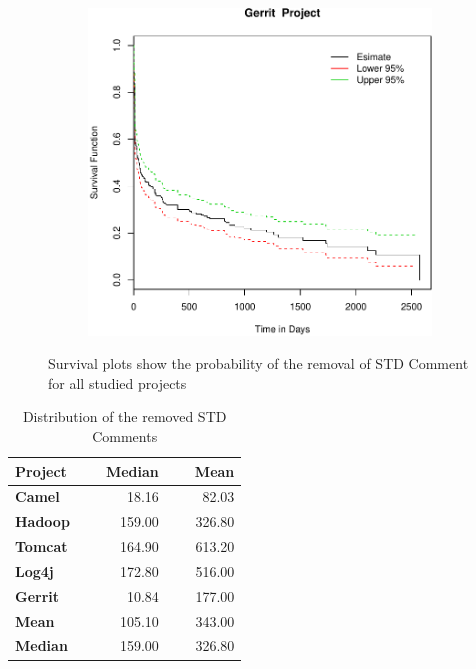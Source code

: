 \begin{figure}[t]
\begin{subfigure}[b]{0.195\textwidth}
		\label{fig:removal_comparison_log4j_survival}
	\end{subfigure}
	\begin{subfigure}[b]{0.195\textwidth}
		\includegraphics[width=\textwidth]{figures/Survival/gerrit.pdf}
		\label{fig:removal_comparison_tomcat_survival} 
	\end{subfigure}
	\caption{Survival plots show the probability of the removal of STD Comment for all studied projects}
\end{figure}
\begin{table}[t]
	\centering
	\caption{Distribution of the removed STD Comments}
	\label{tab:Distribution_of_the_removed_STD_Comments}
	\begin{tabular}{@{}l|rrrr@{}}
		\toprule
		\textbf{Project} &~&\textbf{Median} &~& \textbf{Mean} \\ \midrule
		\textbf{Camel} &~& 18.16 &~& 82.03 \\
		\textbf{Hadoop} &~& 159.00 &~& 326.80 \\
		\textbf{Tomcat} &~& 164.90 &~& 613.20 \\
		\textbf{Log4j} &~& 172.80 &~& 516.00 \\
		\textbf{Gerrit} &~& 10.84 &~& 177.00 \\ \midrule
		\textbf{Mean} &~& 105.10 &~&343.00 \\
		\textbf{Median} &~& 159.00 &~& 326.80 \\ \bottomrule
	\end{tabular}
\end{table}













